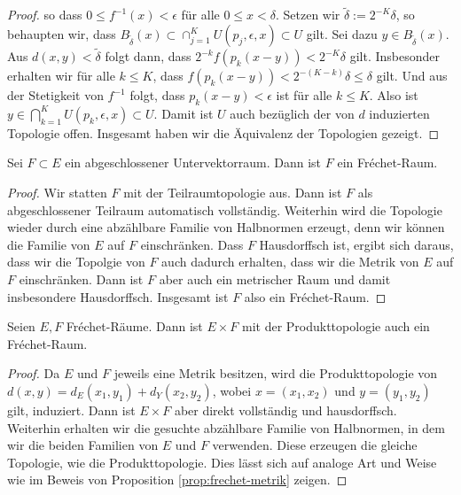 \begin{proof}
  so dass $0 \leq f^{-1}(x) < \epsilon$ für alle $0 \leq x <
  \delta$. Setzen wir $\tilde \delta := 2^{-K} \delta$, so behaupten
  wir, dass $B_{\tilde \delta}(x) \subset \cap_{j=1}^K U(p_j,
    \epsilon, x) \subset U$ gilt. Sei dazu $y \in B_{\tilde
      \delta}(x)$. Aus $d(x,y) < \tilde \delta$ folgt dann, dass
    $2^{-k} f(p_k(x-y)) < 2^{-K} \delta$ gilt. Insbesonder erhalten
    wir für alle $k \leq K$, dass $f(p_k(x-y)) < 2^{-(K-k)} \delta
    \leq \delta$ gilt. Und aus der Stetigkeit von $f^{-1}$ folgt, dass
    $p_k(x-y) < \epsilon$ ist für alle $k \leq K$. Also ist $y \in
    \bigcap_{k=1}^K U(p_k, \epsilon, x) \subset U$. Damit ist $U$ auch
    bezüglich der von $d$ induzierten Topologie offen. Insgesamt haben
    wir die Äquivalenz der Topologien gezeigt.
\end{proof}
  
\begin{thm}
  \label{thm:frechet-abgeschlossen}
  Sei $F \subset E$ ein abgeschlossener Untervektorraum. Dann ist $F$
  ein Fr\'echet-Raum.
\end{thm}

\begin{proof}
  Wir statten $F$ mit der Teilraumtopologie aus. Dann ist $F$
  als abgeschlossener Teilraum automatisch vollständig. Weiterhin wird
  die Topologie wieder durch eine abzählbare Familie von Halbnormen
  erzeugt, denn wir können die Familie von $E$ auf $F$
  einschränken. Dass $F$ Hausdorffsch ist, ergibt sich daraus, dass
  wir die Topolgie von $F$ auch dadurch erhalten, dass wir die Metrik
  von $E$ auf $F$ einschränken. Dann ist $F$ aber auch ein metrischer
  Raum und damit insbesondere Hausdorffsch. Insgesamt ist $F$ also ein
  Fr\'echet-Raum.
\end{proof}

\begin{thm}
  \label{thm:frechet-summe}
  Seien $E, F$ Fr\'echet-Räume. Dann ist $E \times F$ mit der
  Produkttopologie auch ein Fr\'echet-Raum.
\end{thm}

\begin{proof}
  Da $E$ und $F$ jeweils eine Metrik besitzen, wird die
  Produkttopologie von $d(x,y) = d_E(x_1, y_1) + d_Y(x_2, y_2)$, wobei
  $x = (x_1,x_2)$ und $y = (y_1, y_2)$ gilt, induziert. Dann ist $E
  \times F$ aber direkt vollständig und hausdorffsch. Weiterhin
  erhalten wir die gesuchte abzählbare Familie von Halbnormen, in dem
  wir die beiden Familien von $E$ und $F$ verwenden. Diese erzeugen
  die gleiche Topologie, wie die Produkttopologie. Dies lässt sich auf
  analoge Art und Weise wie im Beweis von Proposition
  \ref{prop:frechet-metrik} zeigen.
\end{proof}

